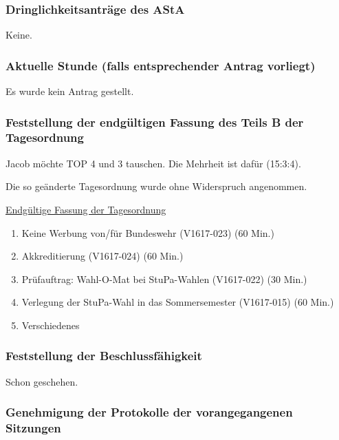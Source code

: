 \documentclass[ngerman,headheight=70pt]{scrartcl}
\begin{document}
    \subsubsection{Dringlichkeitsanträge des AStA}

    Keine.

    \subsubsection{Aktuelle Stunde (falls entsprechender Antrag vorliegt)}

    Es wurde kein Antrag gestellt.

    \subsubsection{Feststellung der endgültigen Fassung des Teils B der Tagesordnung}

    Jacob möchte TOP 4 und 3 tauschen. Die Mehrheit ist dafür (15:3:4).

    Die so geänderte Tagesordnung wurde ohne Widerspruch angenommen.

    \underline{Endgültige Fassung der Tagesordnung}
    \begin{enumerate}[label={\textbf{Top \theenumi}},leftmargin=*]
        \item Keine Werbung von/für Bundeswehr (V1617-023) (60 Min.)
        \item Akkreditierung (V1617-024) (60 Min.)
        \item Prüfauftrag: Wahl-O-Mat bei StuPa-Wahlen (V1617-022) (30 Min.)
        \item Verlegung der StuPa-Wahl in das Sommersemester (V1617-015) (60 Min.)
        \item Verschiedenes
    \end{enumerate}

    \subsubsection{Feststellung der Beschlussfähigkeit}

    Schon geschehen.

    \subsubsection{Genehmigung der Protokolle der vorangegangenen Sitzungen}
\end{document}
